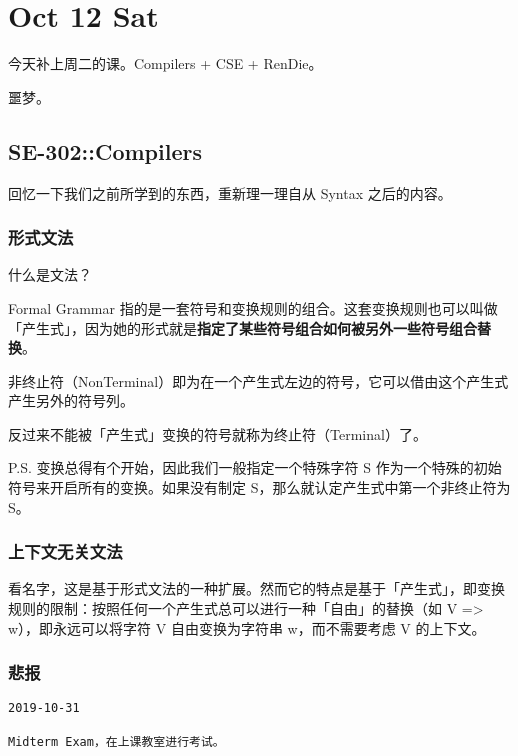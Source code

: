 \documentclass[
]{article}
\date{}
\begin{document}
\hypertarget{header-n0}{%
\section{Oct 12 Sat}\label{header-n0}}

今天补上周二的课。Compilers + CSE + RenDie。

噩梦。

\hypertarget{header-n4}{%
\subsection{SE-302::Compilers}\label{header-n4}}

回忆一下我们之前所学到的东西，重新理一理自从 Syntax 之后的内容。

\hypertarget{header-n6}{%
\subsubsection{形式文法}\label{header-n6}}

什么是文法？

Formal Grammar
指的是一套符号和变换规则的组合。这套变换规则也可以叫做「产生式」，因为她的形式就是\textbf{指定了某些符号组合如何被另外一些符号组合替换}。

非终止符（NonTerminal）即为在一个产生式左边的符号，它可以借由这个产生式产生另外的符号列。

反过来不能被「产生式」变换的符号就称为终止符（Terminal）了。

P.S. 变换总得有个开始，因此我们一般指定一个特殊字符 S
作为一个特殊的初始符号来开启所有的变换。如果没有制定
S，那么就认定产生式中第一个非终止符为 S。

\hypertarget{header-n12}{%
\subsubsection{上下文无关文法}\label{header-n12}}

看名字，这是基于形式文法的一种扩展。然而它的特点是基于「产生式」，即变换规则的限制：按照任何一个产生式总可以进行一种「自由」的替换（如
V =\textgreater{} w），即永远可以将字符 V 自由变换为字符串
w，而不需要考虑 V 的上下文。

\hypertarget{header-n14}{%
\subsubsection{悲报}\label{header-n14}}

\begin{verbatim}
2019-10-31

Midterm Exam，在上课教室进行考试。
\end{verbatim}
\end{document}
